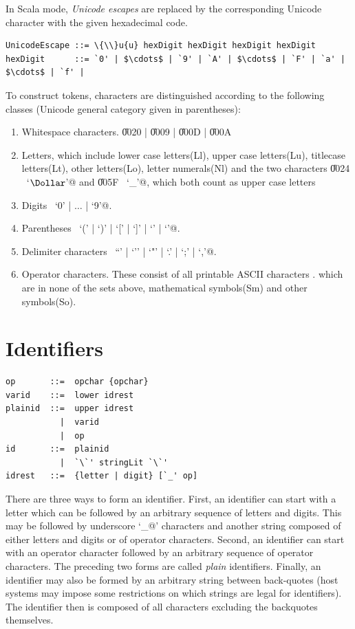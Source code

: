In Scala mode, \textit{Unicode escapes} are replaced by the corresponding
Unicode character with the given hexadecimal code.
\begin{lstlisting}
UnicodeEscape ::= \{\\}u{u} hexDigit hexDigit hexDigit hexDigit
hexDigit      ::= `0' | $\cdots$ | `9' | `A' | $\cdots$ | `F' | `a' | $\cdots$ | `f' |
\end{lstlisting}
To construct tokens, characters are distinguished according to the following classes 
(Unicode general category given in parentheses):
\begin{enumerate}
\item Whitespace characters. \U{0020} | \U{0009} | \U{000D} | \U{000A}
\item Letters, which include lower case letters(Ll), upper case letters(Lu), titlecase letters(Lt), other letters(Lo), letter numerals(Nl) and the 
two characters \U{0024} ~\lstinline@`$\Dollar$'@ and \U{005F} ~\lstinline@`_'@, which
both count as upper case letters
\item Digits ~\lstinline@`0' | $\ldots$ | `9'@.
\item Parentheses ~\lstinline@`(' | `)' | `[' | `]' | `{' | `}'@.
\item Delimiter characters ~\lstinline@``' | `'' | `"' | `.' | `;' | `,'@.
\item Operator characters. These consist of all printable ASCII characters . 
which are in none of the sets above, mathematical symbols(Sm) and other symbols(So).
\end{enumerate}
\newpage
\section{Identifiers}\label{sec:idents}

\syntax\begin{lstlisting}
op       ::=  opchar {opchar} 
varid    ::=  lower idrest
plainid  ::=  upper idrest
           |  varid
           |  op
id       ::=  plainid
           |  `\`' stringLit `\`'
idrest   ::=  {letter | digit} [`_' op]
\end{lstlisting}

There are three ways to form an identifier. First, an identifier can
start with a letter which can be followed by an arbitrary sequence of
letters and digits. This may be followed by underscore `\lstinline@_@'
characters and another string composed of either letters and digits or
of operator characters.  Second, an identifier can start with an operator 
character followed by an arbitrary sequence of operator characters.
The preceding two forms are called {\em plain} identifiers.  Finally,
an identifier may also be formed by an arbitrary string between
back-quotes (host systems may impose some restrictions on which
strings are legal for identifiers).  The identifier then is composed
of all characters excluding the backquotes themselves.
 

